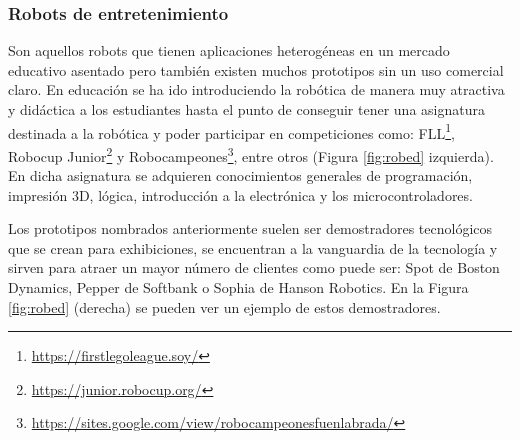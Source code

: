 \subsubsection{Robots de entretenimiento}

Son aquellos robots que tienen aplicaciones heterogéneas en un mercado educativo asentado pero también existen muchos prototipos sin un uso comercial claro. En educación se ha ido introduciendo la robótica de manera muy atractiva y didáctica a los estudiantes hasta el punto de conseguir tener una asignatura destinada a la robótica y poder participar en competiciones como: \ac{FLL}\footnote{\url{https://firstlegoleague.soy/}}, Robocup Junior\footnote{\url{https://junior.robocup.org/}} y Robocampeones\footnote{\url{https://sites.google.com/view/robocampeonesfuenlabrada/}}, entre otros (Figura \ref{fig:robed} izquierda).  En dicha asignatura se adquieren conocimientos generales de programación, impresión 3D, lógica, introducción a la electrónica y los microcontroladores.

Los prototipos nombrados anteriormente suelen ser demostradores tecnológicos que se crean para exhibiciones, se encuentran a la vanguardia de la tecnología y sirven para atraer un mayor número de clientes como puede ser: Spot de Boston Dynamics, Pepper de Softbank o Sophia de Hanson Robotics. En la Figura \ref{fig:robed} (derecha) se pueden ver un ejemplo de estos demostradores.


